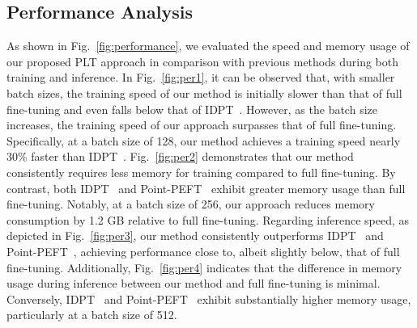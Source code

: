 \subsection{Performance Analysis}  
As shown in Fig.~\ref{fig:performance}, we evaluated the speed and memory usage of our proposed PLT approach in comparison with previous methods during both training and inference. In Fig.~\ref{fig:per1}, it can be observed that, with smaller batch sizes, the training speed of our method is initially slower than that of full fine-tuning and even falls below that of IDPT~\cite{zha2023instance}. However, as the batch size increases, the training speed of our approach surpasses that of full fine-tuning. Specifically, at a batch size of 128, our method achieves a training speed nearly 30\% faster than IDPT~\cite{zha2023instance}. Fig.~\ref{fig:per2} demonstrates that our method consistently requires less memory for training compared to full fine-tuning. By contrast, both IDPT~\cite{zha2023instance} and Point-PEFT~\cite{tang2024point} exhibit greater memory usage than full fine-tuning. Notably, at a batch size of 256, our approach reduces memory consumption by 1.2 GB relative to full fine-tuning. Regarding inference speed, as depicted in Fig.~\ref{fig:per3}, our method consistently outperforms IDPT~\cite{zha2023instance} and Point-PEFT~\cite{tang2024point}, achieving performance close to, albeit slightly below, that of full fine-tuning. Additionally, Fig.~\ref{fig:per4} indicates that the difference in memory usage during inference between our method and full fine-tuning is minimal. Conversely, IDPT~\cite{zha2023instance} and Point-PEFT~\cite{tang2024point} exhibit substantially higher memory usage, particularly at a batch size of 512.



